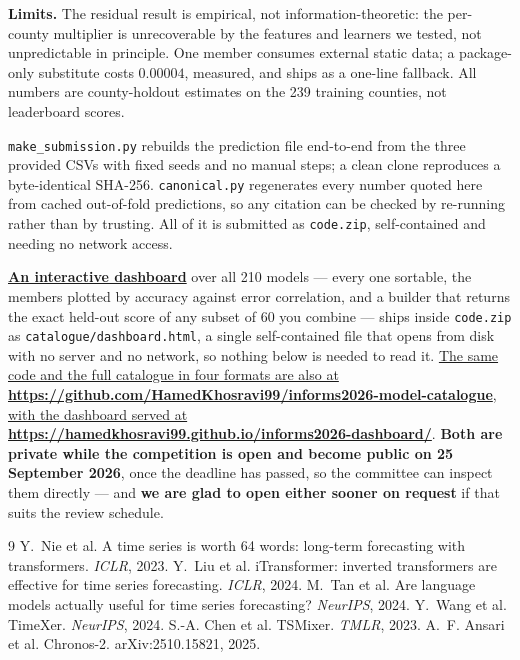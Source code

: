 \documentclass[10pt,letterpaper,twocolumn]{article}
\newcommand{\meth}[1]{\uline{#1}}   %
\begin{document}
\textbf{Limits.} The residual result is empirical, not information-theoretic:
the per-county multiplier is unrecoverable by the features and learners we
tested, not unpredictable in principle. One member consumes external static
data; a package-only substitute costs $0.00004$, measured, and ships as a
one-line fallback. All numbers are county-holdout estimates on the 239 training
counties, not leaderboard scores.

\texttt{make\_submission.py} rebuilds the prediction file end-to-end from the
three provided CSVs with fixed seeds and no manual steps; a clean clone
reproduces a byte-identical SHA-256. \texttt{canonical.py} regenerates every
number quoted here from cached out-of-fold predictions, so any citation can be
checked by re-running rather than by trusting. All of it is submitted as
\texttt{code.zip}, self-contained and needing no network access.

{\footnotesize \meth{\textbf{An interactive dashboard}} over all 210 models --- every one
sortable, the members plotted by accuracy against error correlation, and a
builder that returns the exact held-out score of any subset of 60 you combine
--- ships inside \texttt{code.zip} as \texttt{catalogue/dashboard.html}, a
single self-contained file that opens from disk with no server and no network,
so nothing below is needed to read it. \meth{The same code and the full
catalogue in four formats are also at}
\textbf{\url{https://github.com/HamedKhosravi99/informs2026-model-catalogue}},
\meth{with the dashboard served at}
\textbf{\url{https://hamedkhosravi99.github.io/informs2026-dashboard/}}.
\textbf{Both are private while the competition is open and become public on
25 September 2026}, once the deadline has passed, so the committee can inspect
them directly --- and \textbf{we are glad to open either sooner on request} if
that suits the review schedule.}

{\footnotesize
\begin{thebibliography}{9}\small
{} Y.~Nie et al. A time series is worth 64 words: long-term
forecasting with transformers. \emph{ICLR}, 2023.
 Y.~Liu et al. iTransformer: inverted transformers are effective
for time series forecasting. \emph{ICLR}, 2024.
 M.~Tan et al. Are language models actually useful for time series
forecasting? \emph{NeurIPS}, 2024.
 Y.~Wang et al. TimeXer. \emph{NeurIPS}, 2024.
 S.-A. Chen et al. TSMixer. \emph{TMLR}, 2023.
 A.~F. Ansari et al. Chronos-2. arXiv:2510.15821, 2025.
\end{thebibliography}}
\end{document}
